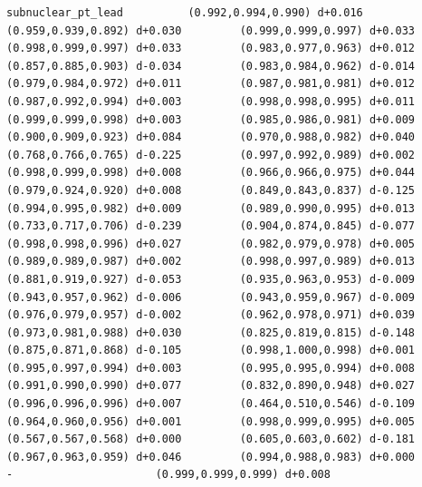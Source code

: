 \documentclass[11pt, letterpaper, openany]{book}
\begin{document}
\begin{empiricalbox}
\begin{lstlisting}[style=terminal]
subnuclear_pt_lead          (0.992,0.994,0.990) d+0.016         (0.959,0.939,0.892) d+0.030         (0.999,0.999,0.997) d+0.033         (0.998,0.999,0.997) d+0.033         (0.983,0.977,0.963) d+0.012         (0.857,0.885,0.903) d-0.034         (0.983,0.984,0.962) d-0.014         (0.979,0.984,0.972) d+0.011         (0.987,0.981,0.981) d+0.012         (0.987,0.992,0.994) d+0.003         (0.998,0.998,0.995) d+0.011         (0.999,0.999,0.998) d+0.003         (0.985,0.986,0.981) d+0.009         (0.900,0.909,0.923) d+0.084         (0.970,0.988,0.982) d+0.040         (0.768,0.766,0.765) d-0.225         (0.997,0.992,0.989) d+0.002         (0.998,0.999,0.998) d+0.008         (0.966,0.966,0.975) d+0.044         (0.979,0.924,0.920) d+0.008         (0.849,0.843,0.837) d-0.125         (0.994,0.995,0.982) d+0.009         (0.989,0.990,0.995) d+0.013         (0.733,0.717,0.706) d-0.239         (0.904,0.874,0.845) d-0.077         (0.998,0.998,0.996) d+0.027         (0.982,0.979,0.978) d+0.005         (0.989,0.989,0.987) d+0.002         (0.998,0.997,0.989) d+0.013         (0.881,0.919,0.927) d-0.053         (0.935,0.963,0.953) d-0.009         (0.943,0.957,0.962) d-0.006         (0.943,0.959,0.967) d-0.009         (0.976,0.979,0.957) d-0.002         (0.962,0.978,0.971) d+0.039         (0.973,0.981,0.988) d+0.030         (0.825,0.819,0.815) d-0.148         (0.875,0.871,0.868) d-0.105         (0.998,1.000,0.998) d+0.001         (0.995,0.997,0.994) d+0.003         (0.995,0.995,0.994) d+0.008         (0.991,0.990,0.990) d+0.077         (0.832,0.890,0.948) d+0.027         (0.996,0.996,0.996) d+0.007         (0.464,0.510,0.546) d-0.109         (0.964,0.960,0.956) d+0.001         (0.998,0.999,0.995) d+0.005         (0.567,0.567,0.568) d+0.000         (0.605,0.603,0.602) d-0.181         (0.967,0.963,0.959) d+0.046         (0.994,0.988,0.983) d+0.000                      -                      (0.999,0.999,0.999) d+0.008     

\end{lstlisting}
\end{empiricalbox}
\end{document}
